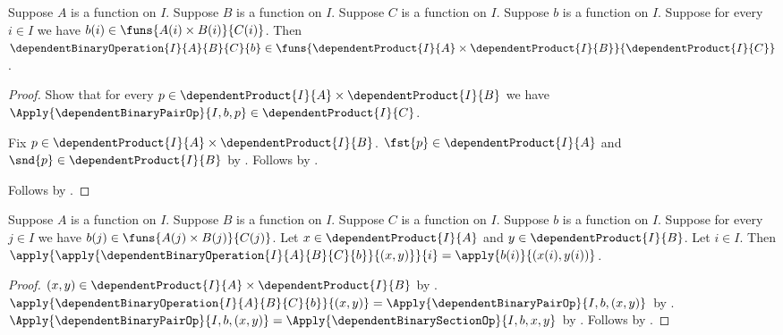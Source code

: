 \begin{proposition}\label{dependent_binary_operation_type}
    Suppose $A$ is a function on $I$.
    Suppose $B$ is a function on $I$.
    Suppose $C$ is a function on $I$.
    Suppose $b$ is a function on $I$.
    Suppose for every $i\in I$ we have
        $b(i)\in\funs{A(i)\times B(i)}{C(i)}$.
    Then
        $\dependentBinaryOperation{I}{A}{B}{C}{b}
            \in\funs{
                \dependentProduct{I}{A}\times\dependentProduct{I}{B}}{
                \dependentProduct{I}{C}}$.
\end{proposition}
\begin{proof}
    Show that for every
        $p\in\dependentProduct{I}{A}\times\dependentProduct{I}{B}$
        we have
        $\Apply{\dependentBinaryPairOp}{I,b,p}
            \in\dependentProduct{I}{C}$.
    \begin{subproof}
        Fix $p\in\dependentProduct{I}{A}\times
            \dependentProduct{I}{B}$.
        $\fst{p}\in\dependentProduct{I}{A}$ and
            $\snd{p}\in\dependentProduct{I}{B}$ by
            .
        Follows by
            .
    \end{subproof}
    Follows by
        .
\end{proof}

\begin{proposition}\label{dependent_binary_operation_coordinate}
    Suppose $A$ is a function on $I$.
    Suppose $B$ is a function on $I$.
    Suppose $C$ is a function on $I$.
    Suppose $b$ is a function on $I$.
    Suppose for every $j\in I$ we have
        $b(j)\in\funs{A(j)\times B(j)}{C(j)}$.
    Let $x\in\dependentProduct{I}{A}$ and
        $y\in\dependentProduct{I}{B}$.
    Let $i\in I$.
    Then
        $\apply{\apply{
            \dependentBinaryOperation{I}{A}{B}{C}{b}}{(x,y)}}{i}
        =\apply{b(i)}{(x(i),y(i))}$.
\end{proposition}
\begin{proof}
    $(x,y)\in\dependentProduct{I}{A}\times
        \dependentProduct{I}{B}$ by .
    $\apply{\dependentBinaryOperation{I}{A}{B}{C}{b}}{(x,y)}
        =\Apply{\dependentBinaryPairOp}{I,b,(x,y)}$ by
        .
    $\Apply{\dependentBinaryPairOp}{I,b,(x,y)}
        =\Apply{\dependentBinarySectionOp}{I,b,x,y}$ by
        .
    Follows by .
\end{proof}

